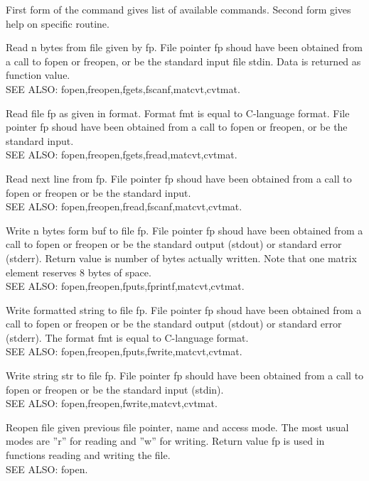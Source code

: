 First form of the command gives list of available commands. Second form gives help on specific routine. 

Read n bytes from file given by fp. File pointer fp shoud have been obtained from a call to fopen or freopen, or be the standard input file stdin. Data is returned as function value.  \\
SEE ALSO: fopen,freopen,fgets,fscanf,matcvt,cvtmat. 

Read file fp as given in format. Format fmt is equal to C-language format. File pointer fp shoud have been obtained from a call to fopen or freopen, or be the standard input. \\
SEE ALSO: fopen,freopen,fgets,fread,matcvt,cvtmat. 

Read next line from fp. File pointer fp shoud have been obtained from a call to fopen or freopen or be the standard input. \\ 
SEE ALSO: fopen,freopen,fread,fscanf,matcvt,cvtmat. 

Write n bytes form buf to file fp. File pointer fp shoud have been obtained from a call to fopen or freopen or be the standard output (stdout) or standard error (stderr). Return value is number of bytes actually written. 
Note that one matrix element reserves 8 bytes of space. \\
SEE ALSO: fopen,freopen,fputs,fprintf,matcvt,cvtmat. 

Write formatted string to file fp. File pointer fp shoud have been obtained from a call to fopen or freopen or be the standard output (stdout) or standard error (stderr). The format fmt is equal to C-language format. \\
SEE ALSO: fopen,freopen,fputs,fwrite,matcvt,cvtmat. 

Write string str to file fp. File pointer fp should have been obtained from a call to fopen or freopen or be the standard input (stdin). \\SEE ALSO: fopen,freopen,fwrite,matcvt,cvtmat. 

Reopen file given previous file pointer, name and access mode. The most usual modes are ''r'' for reading and ''w'' for writing. Return value fp is used in functions reading and writing the file. \\
SEE ALSO: fopen. 

